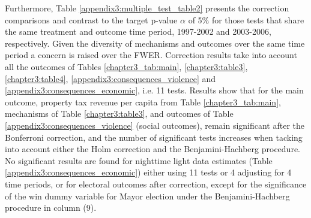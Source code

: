 Furthermore, Table \ref{appendix3:multiple_test_table2} presents the correction comparisons and contrast to the target p-value $\alpha$ of 5\% for those tests that share the same treatment and outcome time period, 1997-2002 and 2003-2006, respectively. Given the diversity of mechanisms and outcomes over the same time period a concern is raised over the FWER. Correction results take into account all the outcomes of Tables \ref{chapter3_tab:main}, \ref{chapter3:table3}, \ref{chapter3:table4}, \ref{appendix3:consequences_violence} and \ref{appendix3:consequences_economic}, i.e. 11 tests. Results show that for the main outcome, property tax revenue per capita from Table \ref{chapter3_tab:main}, mechanisms of Table \ref{chapter3:table3}, and outcomes of Table \ref{appendix3:consequences_violence} (social outcomes), remain significant after the Bonferroni correction, and the number of significant tests increases when tacking into account either the Holm correction and the Benjamini-Hachberg procedure. No significant results are found for nighttime light data estimates (Table \ref{appendix3:consequences_economic}) either using 11 tests or 4 adjusting for 4 time periods, or for electoral outcomes after correction, except for the significance of the win dummy variable for Mayor election under the Benjamini-Hachberg procedure in column (9). 

